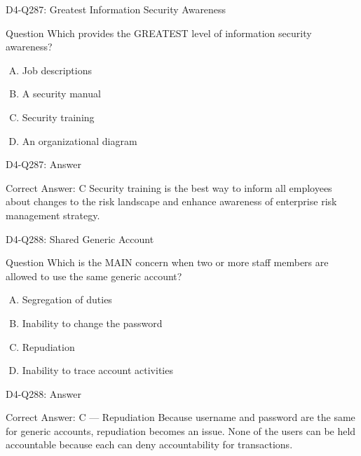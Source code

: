 \documentclass{beamer}
\begin{document}
	\begin{frame}{D4-Q287: Greatest Information Security Awareness}
		\begin{block}{Question}
			Which provides the GREATEST level of information security awareness?
		\end{block}
		\begin{enumerate}[(A)]
			\item Job descriptions
			\item A security manual
			\item Security training
			\item An organizational diagram
		\end{enumerate}
	\end{frame}
	\begin{frame}{D4-Q287: Answer}
		\begin{block}{Correct Answer: C}
			Security training is the best way to inform all employees about changes to the risk landscape and enhance awareness of enterprise risk management strategy.
		\end{block}
	\end{frame}
	
	\begin{frame}{D4-Q288: Shared Generic Account}
		\begin{block}{Question}
			Which is the MAIN concern when two or more staff members are allowed to use the same generic account?
		\end{block}
		\begin{enumerate}[(A)]
			\item Segregation of duties
			\item Inability to change the password
			\item Repudiation
			\item Inability to trace account activities
		\end{enumerate}
	\end{frame}
	\begin{frame}{D4-Q288: Answer}
		\begin{block}{Correct Answer: C --- Repudiation}
			Because username and password are the same for generic accounts, repudiation becomes an issue. None of the users can be held accountable because each can deny accountability for transactions.
		\end{block}
	\end{frame}
	
\end{document}

